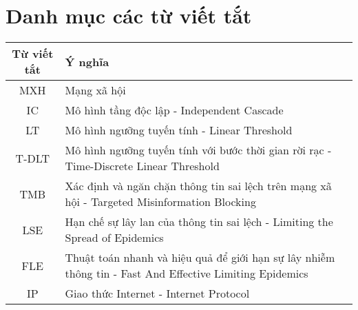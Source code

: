 \chapter*{Danh mục các từ viết tắt}
\quad 
\begin{table}[h]
\begin{center}
\large{
\begin{tabular}{|c|p{12cm}|}
\hline
\textbf{Từ viết tắt} & \textbf{Ý nghĩa}
\\
\hline
MXH & Mạng xã hội
\\
\hline
IC & Mô hình tầng độc lập - Independent Cascade
\\
\hline
LT & Mô hình ngưỡng tuyến tính - Linear Threshold
\\
\hline
T-DLT & Mô hình ngưỡng tuyến tính với bước thời gian rời rạc - Time-Discrete Linear Threshold
\\
\hline
TMB & Xác định và ngăn chặn thông tin sai lệch trên mạng xã hội - Targeted Misinformation Blocking
\\
\hline
LSE & Hạn chế sự lây lan của thông tin sai lệch - Limiting the Spread of Epidemics
\\
\hline
FLE & Thuật toán nhanh và hiệu quả để giới hạn sự lây nhiễm thông tin - Fast And Effective Limiting Epidemics
\\
\hline
IP & Giao thức Internet - Internet Protocol
\\
\hline

\end{tabular}
}
\end{center}
\end{table}